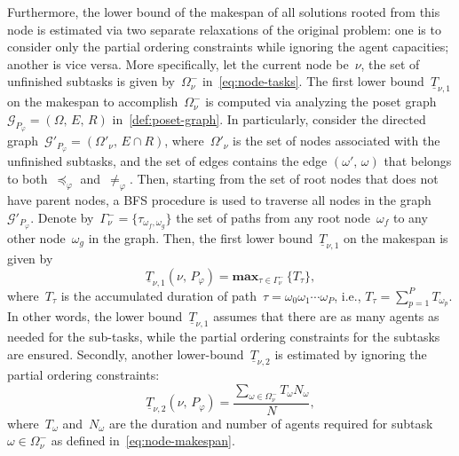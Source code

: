 Furthermore, the lower bound of the makespan of all solutions rooted from this
node is estimated via two separate relaxations of the original problem:
one is to consider only the partial ordering constraints while ignoring
the agent capacities;
another is vice versa.
More specifically, let the current node be~$\nu$,
the set of unfinished subtasks is given by~$\Omega^-_\nu$ in~\eqref{eq:node-tasks}.
The first lower bound~$\underline{T}_{\nu,1}$ on the makespan
to accomplish~$\Omega^-_\nu$ is computed via analyzing the poset
graph~$\mathcal{G}_{P_\varphi}=(\Omega,\, E,\, R)$ in~\eqref{def:poset-graph}.
In particularly, consider the directed
graph~$\mathcal{G}'_{P_\varphi}=(\Omega'_\nu,\, E\cap R )$,
where~$\Omega'_\nu$ is the set of nodes associated with the unfinished subtasks,
and the set of edges contains the edge $(\omega',\,\omega)$ that belongs to
both~$\preceq_{\varphi}$ and~$\neq_{\varphi}$.
Then, starting from the set of root nodes that does not have parent nodes,
a BFS procedure is used to traverse all nodes in the graph~$\mathcal{G}'_{P_\varphi}$.
Denote by~$\Gamma^-_{\nu}=\{\tau_{\omega_f,\omega_g}\}$ the set of paths
from any root node~$\omega_f$ to any other node~$\omega_g$ in the graph.
Then, the first lower bound~$\underline{T}_{\nu,1}$ on the makespan is given by
\begin{equation}\label{eq:lower-bound-1}
\underline{T}_{\nu,1} (\nu,\,P_{\varphi})=\textbf{max}_{\tau\in \Gamma^-_\nu} \, \{T_{\tau}\},
\end{equation}
where~$T_{\tau}$ is the accumulated duration
of path~$\tau=\omega_0\omega_1\cdots \omega_P$, i.e., $T_\tau=\sum_{p=1}^PT_{\omega_p}$.
In other words, the lower bound~$\underline{T}_{\nu,1}$ assumes that
there are as many agents as needed for the sub-tasks, while the partial ordering
constraints for the subtasks are ensured.
Secondly, another lower-bound~$\underline{T}_{\nu,2}$ is estimated by
ignoring the partial ordering constraints:
\begin{equation}\label{eq:lower-bound-2}
\underline{T}_{\nu,2} (\nu,\,P_{\varphi})=\frac{\sum_{\omega\in \Omega^-_{\nu}}
T_{\omega} N_{\omega}}{N},
\end{equation}
where~$T_{\omega}$ and~$N_{\omega}$ are the duration and number of agents required
for subtask~$\omega\in \Omega^-_\nu$ as defined in~\eqref{eq:node-makespan}.
